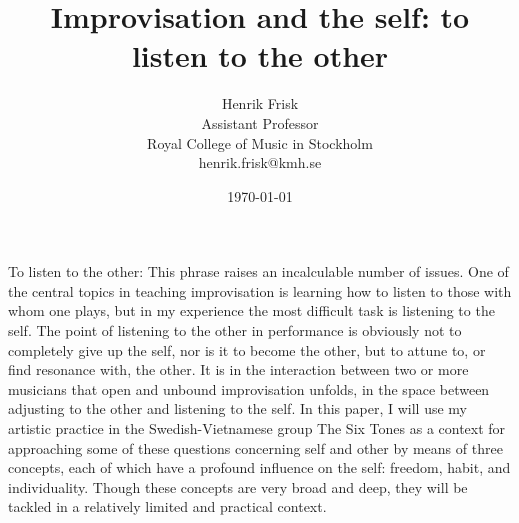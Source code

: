 \documentclass[a4paper]{article}
\title{Improvisation and the self: to listen to the other}
\author{Henrik Frisk\\{\small Assistant Professor}\\{\small Royal College of Music in Stockholm}\\{\small henrik.frisk@kmh.se}}
\date{\today}
\begin{document}
\maketitle

\thispagestyle{empty}

\section*{ }


To listen to the other: This phrase raises an incalculable number of issues. One of the central topics in teaching improvisation is learning how to listen to those with whom one plays, but in my experience the most difficult task is listening to the self. The point of listening to the other in performance is obviously not to completely give up the self, nor is it to become the other, but to attune to, or find resonance with, the other. It is in the interaction between two or more musicians that open and unbound improvisation unfolds, in the space between adjusting to the other and listening to the self. In this paper, I will use my artistic practice in the Swedish-Vietnamese group The Six Tones as a context for approaching some of these questions concerning self and other by means of three concepts, each of which have a profound influence on the self: freedom, habit, and individuality. Though these concepts are very broad and deep, they will be tackled in a relatively limited and practical context. 
\end{document}
